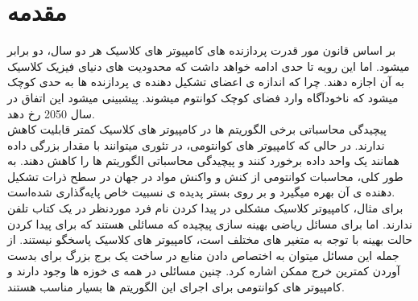\chapter{مقدمه}
بر اساس قانون مور
قدرت پردازنده های کامپیوتر های کلاسیک هر دو سال، دو برابر میشود. اما این رویه تا حدی ادامه خواهد داشت که محدودیت های دنیای فیزیک کلاسیک به آن اجازه دهند. چرا که اندازه ی اعضای تشکیل دهنده ی پردازنده ها به حدی کوچک میشود که ناخودآگاه وارد فضای کوچک کوانتوم
 میشوند. پیشبینی میشود این اتفاق در سال 2050 رخ دهد.
\\
 پیچیدگی محاسباتی
 برخی الگوریتم ها در کامپیوتر های کلاسیک کمتر قابلیت کاهش ندارند. در حالی که کامپیوتر های کوانتومی، در تئوری میتوانند با مقدار بزرگی داده همانند یک واحد داده برخورد کنند و پیچیدگی محاسباتی الگوریتم ها را کاهش دهند.
\cite{singhbook1in2}
به طور کلی، محاسبات کوانتومی از کنش و واکنش مواد در جهان در سطح ذرات تشکیل دهنده ی آن بهره میگیرد و بر روی بستر پدیده ی نسبیت خاص
 پایه‌گذاری شده‌است. 
\\
برای مثال، کامپیوتر کلاسیک مشکلی در پیدا کردن نام فرد موردنظر در یک کتاب تلفن ندارند. اما برای مسائل ریاضی بهینه سازی پیچیده
  که مسائلی هستند که برای پیدا کردن حالت بهینه با توجه به متغیر های مختلف است، کامپیوتر های کلاسیک پاسخگو نیستند. از جمله این مسائل میتوان به اختصاص دادن منابع در ساخت یک برج بزرگ برای بدست آوردن کمترین خرج ممکن اشاره کرد.  چنین مسائلی در همه ی خوزه ها وجود دارند و کامپیوتر های کوانتومی برای اجرای این الگوریتم ها بسیار مناسب هستند. 
\cite{singhbook1in4}

